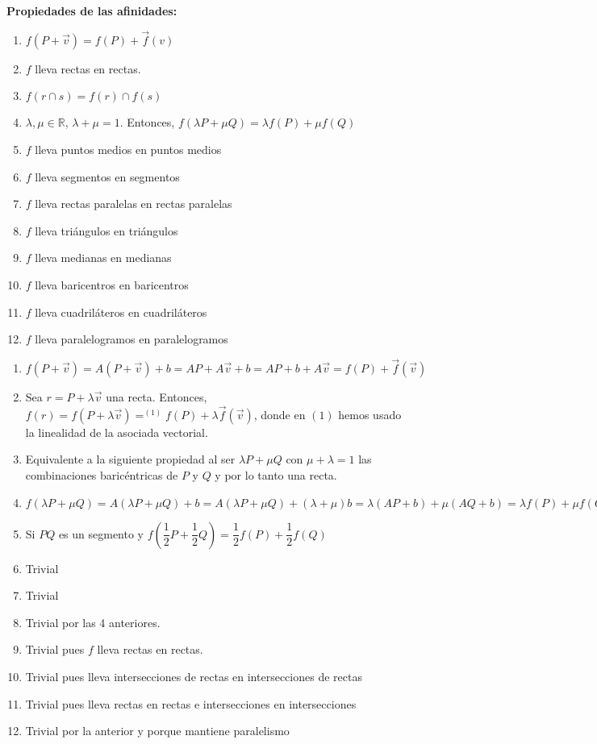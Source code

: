 \documentclass[11pt, a4paper, titlepage]{article}
\makeatletter
\renewenvironment{proof}[1][\proofname] {\vspace{-15pt}\par\pushQED{\qed}\normalfont\topsep6\p@\@plus6\p@\relax\trivlist\item[\hskip\labelsep\it#1\@addpunct{.}]\ignorespaces}{\popQED\endtrivlist\@endpefalse}
\newcommand{\R}{\mathbb{R}}
\renewcommand{\vec}{\overrightarrow}
\theoremstyle{theorem-style}
\theoremstyle{definition-style}
\theoremstyle{remark-style}
\theoremstyle{example-style}
\makeatother
\begin{document}
\textbf{Propiedades de las afinidades:}\\
\begin{enumerate}
\item $f(P + \vec{v}) = f(P) + \vec{f}(v)$
\item $f$ lleva rectas en rectas.
\item $f(r\cap s) = f(r) \cap f(s)$
\item $\lambda,\mu \in \R$, $\lambda+\mu=1$. Entonces, $f(\lambda P + \mu Q) = \lambda f(P) +  \mu f(Q)$
\item $f$ lleva puntos medios en puntos medios
\item $f$ lleva segmentos en segmentos
\item $f$ lleva rectas paralelas en rectas paralelas
\item $f$ lleva triángulos en triángulos
\item $f$ lleva medianas en medianas
\item $f$ lleva baricentros en baricentros
\item $f$ lleva cuadriláteros en cuadriláteros
\item $f$ lleva paralelogramos en paralelogramos
\end{enumerate}
\begin{proof}\hfill
  \begin{enumerate}
  \item $f(P+\vec{v}) = A(P+\vec{v}) + b = AP + A\vec{v} + b = AP + b + A\vec{v} = f(P) + \vec{f}(\vec{v})$
  \item Sea $r = P + \lambda \vec{v}$ una recta. Entonces, $f(r) = f(P + \lambda \vec{v}) =^{(1)} f(P) + \lambda \vec{f}(\vec{v})$, donde en $(1)$ hemos usado la linealidad de la asociada vectorial.
  \item Equivalente a la siguiente propiedad al ser $\lambda P + \mu Q$ con $\mu+\lambda = 1$ las combinaciones baricéntricas de $P$ y $Q$ y por lo tanto una recta.
  \item $f(\lambda P + \mu Q) = A(\lambda P + \mu Q) + b =A(\lambda P + \mu Q) + (\lambda + \mu)b = \lambda (AP + b) + \mu (AQ + b) = \lambda f(P) + \mu f(Q)  $
  \item Si $PQ$ es un segmento y $f(\dfrac{1}{2}P + \dfrac{1}{2}Q) = \dfrac{1}{2}f(P) +  \dfrac{1}{2}f(Q)$
  \item Trivial
  \item Trivial
  \item Trivial por las 4 anteriores.
  \item Trivial pues $f$ lleva rectas en rectas.
  \item Trivial pues lleva intersecciones de rectas en intersecciones de rectas
  \item Trivial pues lleva rectas en rectas e intersecciones en intersecciones
  \item Trivial por la anterior y porque mantiene paralelismo

    
  \end{enumerate}
\end{proof}
\end{document}
